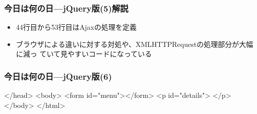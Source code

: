 \documentclass[dvipsk]{beamer}
\begin{document}
\begin{frame}[containsverbatim]
\frametitle{今日は何の日---jQuery版(5)解説}
\begin{itemize}
 \item  44行目から53行目はAjaxの処理を定義
 \item ブラウザによる違いに対する対処や、XMLHTTPRequestの処理部分が大幅に減っ
	       ていて見やすいコードになっている
\end{itemize}
 \end{frame}
\begin{frame}[containsverbatim]
\frametitle{今日は何の日---jQuery版(6)}
 {\scriptsize
 \begin{listingcont}
</head>
<body>
  <form id="menu"></form>
  <p id="details"> </p>
</body>
</html> 
\end{listingcont}
}
\end{frame}
\iffalse
\end{document}
